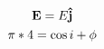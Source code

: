 \documentclass{article}
\begin{document}
    \begin{gather}
        \mathbf{E}= E\vu{j} \\
        \pi * 4 = \cos{i + \phi}
    \end{gather}
\end{document}
